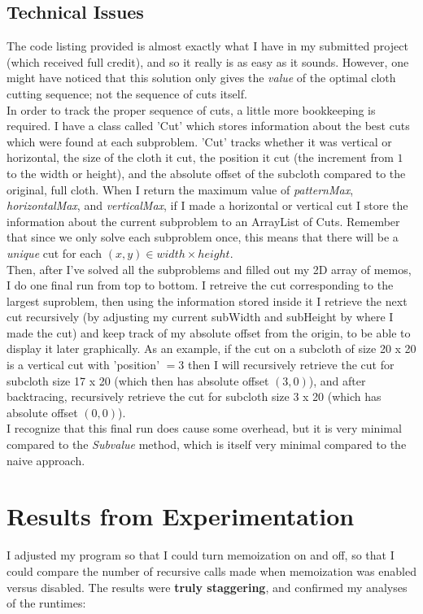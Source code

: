 \documentclass[paper=a4, fontsize=11pt]{scrartcl} %
\numberwithin{equation}{section} %
\numberwithin{figure}{section} %
\numberwithin{table}{section} %
\begin{document}

\subsection{Technical Issues}
The code listing provided is almost exactly what I have in my submitted project (which received full credit), and so it really is as easy as it sounds. However, one might have noticed that this solution only gives the \emph{value} of the optimal cloth cutting sequence; not the sequence of cuts itself.\\
\indent In order to track the proper sequence of cuts, a little more bookkeeping is required. I have a class called 'Cut' which stores information about the best cuts which were found at each subproblem. 'Cut' tracks whether it was vertical or horizontal, the size of the cloth it cut, the position it cut (the increment from $1$ to the width or height), and the absolute offset of the subcloth compared to the original, full cloth. When I return the maximum value of \emph{patternMax}, \emph{horizontalMax}, and \emph{verticalMax}, if I made a horizontal or vertical cut I store the information about the current subproblem to an ArrayList of Cuts. Remember that since we only solve each subproblem once, this means that there will be a \emph{unique} cut for each $(x, y) \in width \times height$. \\
\indent Then, after I've solved all the subproblems and filled out my 2D array of memos, I do one final run from top to bottom. I retreive the cut corresponding to the largest suproblem, then using the information stored inside it I retrieve the next cut recursively (by adjusting my current subWidth and subHeight by where I made the cut) and keep track of my absolute offset from the origin, to be able to display it later graphically. As an example, if the cut on a subcloth of size 20 x 20 is a vertical cut with 'position' $= 3$ then I will recursively retrieve the cut for subcloth size 17 x 20 (which then has absolute offset $(3, 0)$), and after backtracing, recursively retrieve the cut for subcloth size 3 x 20 (which has absolute offset $(0, 0)$).   \\
\indent I recognize that this final run does cause some overhead, but it is very minimal compared to the \emph{Subvalue} method, which is itself very minimal compared to the naive approach.

\section{Results from Experimentation}
I adjusted my program so that I could turn memoization on and off, so that I could compare the number of recursive calls made when memoization was enabled versus disabled. The results were \textbf{truly staggering}, and confirmed my analyses of the runtimes:
\end{document}
